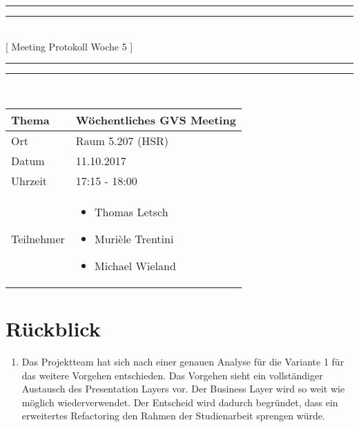 \documentclass[11pt, a4paper,oneside]{scrartcl}
\begin{document}
\centering
\rule{\textwidth}{1.6pt}\vspace*{-\baselineskip}\vspace*{2pt} %
\rule{\textwidth}{0.4pt}\\[\baselineskip] %
{\LARGE [ Meeting Protokoll Woche 5 ]}\\[0.2\baselineskip] %
\rule{\textwidth}{0.4pt}\vspace*{-\baselineskip}\vspace{3.2pt} %
\rule{\textwidth}{1.6pt}\\[2\baselineskip] %

\begin{tabu} to \linewidth {l X }
	\toprule
	\textbf{Thema} & \textbf{Wöchentliches GVS Meeting} \\
	\midrule
	Ort & Raum 5.207 (HSR) \\
	Datum & 11.10.2017 \\
	Uhrzeit & 17:15 - 18:00 \\
	Teilnehmer & 
	\begin{minipage}[t]{\textwidth}
	  	\begin{itemize}
	  		\item Thomas Letsch
			\item Murièle Trentini
			\item Michael Wieland
	  	\end{itemize}
	\end{minipage}
	\\
	\bottomrule
\end{tabu}


\section{Rückblick}
\begin{enumerate}
	\item Das Projektteam hat sich nach einer genauen Analyse für die Variante 1 für das weitere Vorgehen entschieden. Das Vorgehen sieht ein vollständiger Austausch des Presentation Layers vor. Der Business Layer wird so weit wie möglich wiederverwendet. Der Entscheid wird dadurch begründet, dass ein erweitertes Refactoring den Rahmen der Studienarbeit sprengen würde.  
\end{enumerate}
\end{document}

